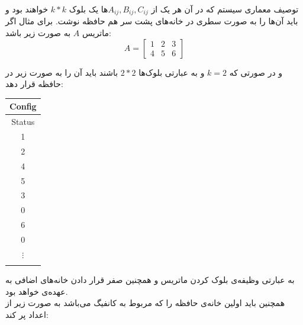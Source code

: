 \documentclass[]{article}
\begin{document}
\begin{section-container}{توصیف معماری سیستم}
که در آن هر یک از $A_{ij} , B_{ij} , C_{ij}$ها یک بلوک $k*k$ خواهند بود و باید آن‌ها را به صورت سطری در خانه‌های پشت سر هم حافظه نوشت. برای مثال اگر ماتریس $A$ به صورت زیر باشد:
$$ A = \begin{bmatrix}
1& 2 & 3\\
4& 5 & 6
\end{bmatrix} $$

و در صورتی که 
$k=2$
و به عبارتی بلوک‌ها $2*2$ باشند  باید آن را به صورت زیر در حافظه قرار دهد:

\begin{table}[h]
	\centering
	\begin{tabular}{clll}
		\hline
		\multicolumn{4}{|c|}{Config}                                          \\ \hline
		\multicolumn{4}{|c|}{Status}                                          \\ \hline
		\multicolumn{4}{|c|}{1}                                        \\ \hline
		\multicolumn{4}{|c|}{2}                                        \\ \hline
		\multicolumn{4}{|c|}{4}                                        \\ \hline
		\multicolumn{4}{|c|}{5}                                        \\ \hline
		
		\multicolumn{4}{|c|}{3}                                        \\ \hline
				\multicolumn{4}{|c|}{0}                                        \\ \hline
					\multicolumn{4}{|c|}{6}                                        \\ \hline
										\multicolumn{4}{|c|}{0}                                        \\ \hline
				\multicolumn{4}{|c|}{$\vdots$}                                        \\ \hline
		\multicolumn{4}{|l|}{\cellcolor[HTML]{595959}{\color[HTML]{595959}aaaaaaaaaaaaaaaaaaaaa }} \\ \hline   
	\end{tabular}
\end{table}

به عبارتی وظیفه‌ی بلوک کردن ماتریس و همچنین صفر قرار دادن خانه‌های اضافی به عهده‌ی  خواهد بود. \\ 
همچنین  باید اولین خانه‌ی حافظه را که مربوط به کانفیگ می‌باشد به صورت زیر از اعداد پر کند:


\end{section-container}
\end{document}
